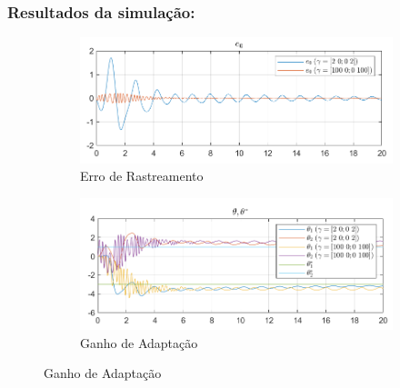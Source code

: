 \documentclass[10pt]{article}
\begin{document}
\subsubsection{Resultados da simulação:}

\begin{figure}[h!]
    \centering
    \begin{subfigure}[b]{0.35\textwidth}
        \centering
        \includegraphics[width=\textwidth]{img/fig02a.png}
        \caption{Erro de Rastreamento}
    \end{subfigure}
    \begin{subfigure}[b]{0.35\textwidth}
        \centering
        \includegraphics[width=\textwidth]{img/fig02b.png}
        \caption{Ganho de Adaptação}
    \end{subfigure}


\end{figure}
\end{document}
